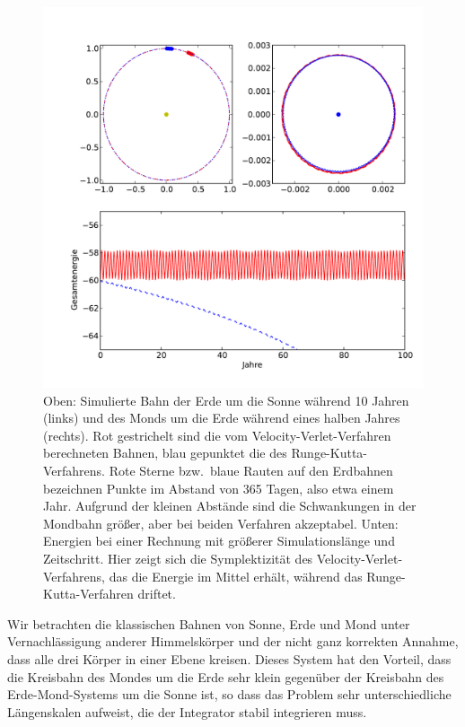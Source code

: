 \begin{figure}
  \centering
  \includegraphics[width=\textwidth]{plots/planets}
  \caption{Oben: Simulierte Bahn der Erde um die Sonne während 10
    Jahren (links) und des Monds um die Erde während eines halben
    Jahres (rechts). Rot gestrichelt sind die vom
    Velocity-Verlet-Verfahren berechneten Bahnen, blau gepunktet die
    des Runge-Kutta-Verfahrens. Rote Sterne bzw.\ blaue Rauten auf den
    Erdbahnen bezeichnen Punkte im Abstand von 365 Tagen, also etwa
    einem Jahr. Aufgrund der kleinen Abstände sind die Schwankungen in
    der Mondbahn größer, aber bei beiden Verfahren akzeptabel. Unten:
    Energien bei einer Rechnung mit größerer Simulationslänge und
    Zeitschritt. Hier zeigt sich die Symplektizität des
    Velocity-Verlet-Verfahrens, das die Energie im Mittel erhält,
    während das Runge-Kutta-Verfahren driftet.}
  \label{fig:planets}
\end{figure}

Wir betrachten die klassischen Bahnen von Sonne, Erde und Mond unter
Vernachlässigung anderer Himmelskörper und der nicht ganz korrekten
Annahme, dass alle drei Körper in einer Ebene kreisen. Dieses System
hat den Vorteil, dass die Kreisbahn des Mondes um die Erde sehr klein
gegenüber der Kreisbahn des Erde-Mond-Systems um die Sonne ist, so
dass das Problem sehr unterschiedliche Längenskalen aufweist, die der
Integrator stabil integrieren muss.

